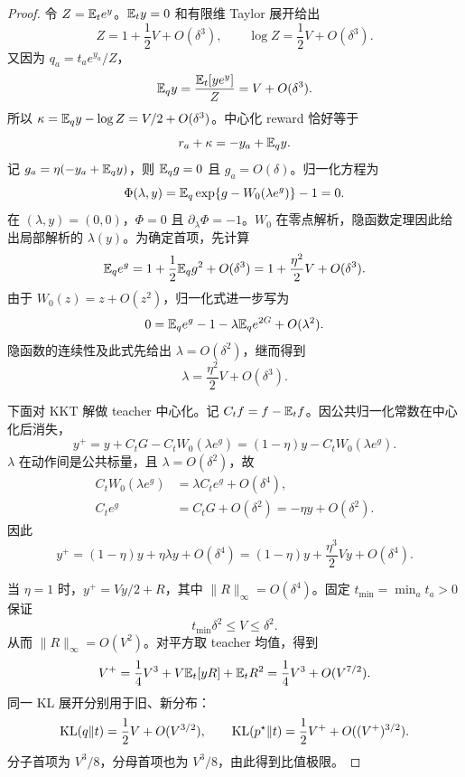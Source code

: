 \begin{proof}
令 $Z=\mathbb E_te^y$。$\mathbb E_ty=0$ 和有限维 Taylor 展开给出
\begin{equation*}
 Z=1+\frac12V+O(\delta^3),\qquad
 \log Z=\frac12V+O(\delta^3).
\end{equation*}
又因为 $q_a=t_ae^{y_a}/Z$，
\begin{equation*}
 \mathbb E_qy=\frac{\mathbb E_t[y e^y]}{Z}=V+O(\delta^3).
\end{equation*}
所以 $\kappa=\mathbb E_qy-\log Z=V/2+O(\delta^3)$。中心化 reward 恰好等于
\begin{equation*}
 r_a+\kappa=-y_a+\mathbb E_qy.
\end{equation*}
记 $g_a=\eta(-y_a+\mathbb E_qy)$，则 $\mathbb E_qg=0$ 且 $g_a=O(\delta)$。归一化方程为
\begin{equation*}
 \Phi(\lambda,y)
 =\mathbb E_q\exp\{g-W_0(\lambda e^g)\}-1=0.
\end{equation*}
在 $(\lambda,y)=(0,0)$，$\Phi=0$ 且 $\partial_\lambda\Phi=-1$。$W_0$ 在零点解析，隐函数定理因此给出局部解析的 $\lambda(y)$。为确定首项，先计算
\begin{equation*}
 \mathbb E_qe^g=1+\frac12\mathbb E_qg^2+O(\delta^3)
 =1+\frac{\eta^2}{2}V+O(\delta^3).
\end{equation*}
由于 $W_0(z)=z+O(z^2)$，归一化式进一步写为
\begin{equation*}
 0=\mathbb E_qe^g-1-\lambda\mathbb E_qe^{2G}+O(\lambda^2).
\end{equation*}
隐函数的连续性及此式先给出 $\lambda=O(\delta^2)$，继而得到
\begin{equation*}
 \lambda=\frac{\eta^2}{2}V+O(\delta^3).
\end{equation*}

下面对 KKT 解做 teacher 中心化。记 $C_tf=f-\mathbb E_tf$。因公共归一化常数在中心化后消失，
\begin{equation*}
 y^+=y+C_tG-C_tW_0(\lambda e^g)
 =(1-\eta)y-C_tW_0(\lambda e^g).
\end{equation*}
$\lambda$ 在动作间是公共标量，且 $\lambda=O(\delta^2)$，故
\begin{align*}
 C_tW_0(\lambda e^g)
 &=\lambda C_te^g+O(\delta^4),\\
 C_te^g&=C_tG+O(\delta^2)
 =-\eta y+O(\delta^2).
\end{align*}
因此
\begin{equation*}
 y^+=(1-\eta)y+\eta\lambda y+O(\delta^4)
 =(1-\eta)y+\frac{\eta^3}{2}Vy+O(\delta^4).
\end{equation*}

当 $\eta=1$ 时，$y^+=Vy/2+R$，其中 $\|R\|_\infty=O(\delta^4)$。固定 $t_{\min}=\min_at_a>0$ 保证
\begin{equation*}
 t_{\min}\delta^2\le V\le\delta^2.
\end{equation*}
从而 $\|R\|_\infty=O(V^2)$。对平方取 teacher 均值，得到
\begin{equation*}
 V^+=\frac14V^3+V\mathbb E_t[yR]+\mathbb E_tR^2
 =\frac14V^3+O(V^{7/2}).
\end{equation*}
同一 KL 展开分别用于旧、新分布：
\begin{equation*}
 \operatorname{KL}(q\Vert t)=\frac12V+O(V^{3/2}),
 \qquad
 \operatorname{KL}(p^\star\Vert t)=\frac12V^++O((V^+)^{3/2}).
\end{equation*}
分子首项为 $V^3/8$，分母首项也为 $V^3/8$，由此得到比值极限。
\end{proof}

